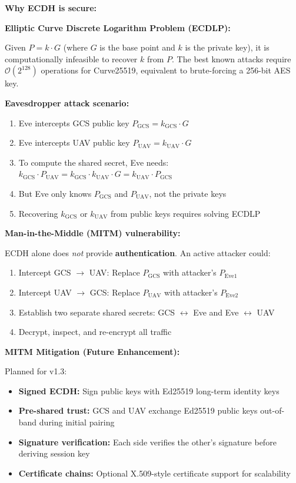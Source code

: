 \documentclass[11pt,a4paper]{article}
\begin{document}
\textbf{Why ECDH is secure:}

\begin{alertbox}
\textbf{Elliptic Curve Discrete Logarithm Problem (ECDLP):}

Given $P = k \cdot G$ (where $G$ is the base point and $k$ is the private key), it is computationally infeasible to recover $k$ from $P$. The best known attacks require $\mathcal{O}(2^{128})$ operations for Curve25519, equivalent to brute-forcing a 256-bit AES key.
\end{alertbox}

\textbf{Eavesdropper attack scenario:}
\begin{enumerate}[noitemsep]
    \item Eve intercepts GCS public key $P_{\text{GCS}} = k_{\text{GCS}} \cdot G$
    \item Eve intercepts UAV public key $P_{\text{UAV}} = k_{\text{UAV}} \cdot G$
    \item To compute the shared secret, Eve needs:\\
    $k_{\text{GCS}} \cdot P_{\text{UAV}} = k_{\text{GCS}} \cdot k_{\text{UAV}} \cdot G = k_{\text{UAV}} \cdot P_{\text{GCS}}$
    \item But Eve only knows $P_{\text{GCS}}$ and $P_{\text{UAV}}$, not the private keys
    \item Recovering $k_{\text{GCS}}$ or $k_{\text{UAV}}$ from public keys requires solving ECDLP
\end{enumerate}

\textbf{Man-in-the-Middle (MITM) vulnerability:}

ECDH alone does \emph{not} provide \textbf{authentication}. An active attacker could:
\begin{enumerate}[noitemsep]
    \item Intercept GCS $\to$ UAV: Replace $P_{\text{GCS}}$ with attacker's $P_{\text{Eve1}}$
    \item Intercept UAV $\to$ GCS: Replace $P_{\text{UAV}}$ with attacker's $P_{\text{Eve2}}$
    \item Establish two separate shared secrets: GCS $\leftrightarrow$ Eve and Eve $\leftrightarrow$ UAV
    \item Decrypt, inspect, and re-encrypt all traffic
\end{enumerate}

\textbf{MITM Mitigation (Future Enhancement):}

Planned for v1.3:
\begin{itemize}[noitemsep]
    \item \textbf{Signed ECDH:} Sign public keys with Ed25519 long-term identity keys
    \item \textbf{Pre-shared trust:} GCS and UAV exchange Ed25519 public keys out-of-band during initial pairing
    \item \textbf{Signature verification:} Each side verifies the other's signature before deriving session key
    \item \textbf{Certificate chains:} Optional X.509-style certificate support for scalability
\end{itemize}
\end{document}
